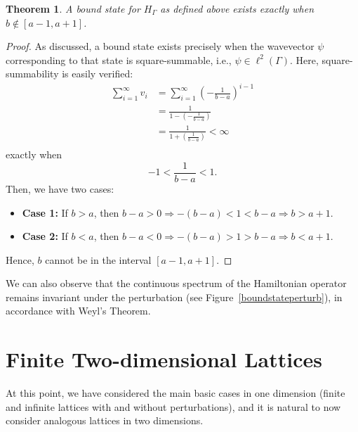 \documentclass{article}
\newtheorem{theorem}{Theorem}
\newcommand{\hg}{H_\Gamma}
\numberwithin{equation}{section}
\numberwithin{theorem}{section}
\numberwithin{proposition}{section}
\numberwithin{lemma}{section}
\numberwithin{corollary}{section}
\numberwithin{definition}{section}
\begin{document}
\begin{theorem}
	A bound state for $\hg$ as defined above exists exactly when $b \notin [a-1, a+1]$.
\end{theorem}

\begin{proof}
As discussed, a bound state exists precisely when the wavevector $\psi$ corresponding to that state is square-summable, i.e., $\psi \in \ell^2(\Gamma)$. Here, square-summability is easily verified:
\begin{align*}
	\sum\limits_{i=1}^\infty v_i &= \sum\limits_{i=1}^\infty \left( - \frac{1}{b-a} \right) ^ {i-1} \\
		&= \frac{1}{1-\left( - \frac{1}{b-a} \right)} \\
		&= \frac{1}{1 +\left( \frac{1}{b-a} \right)} < \infty \\
\end{align*}
exactly when \[-1 < \frac{1}{b-a} <1.\] Then, we have two cases:
\begin{itemize}
	\item \textbf{Case 1:} If $b > a$, then $b-a > 0 \Rightarrow -(b-a) < 1 < b-a \Rightarrow b > a+1.$
	\item \textbf{Case 2:} If $b < a$, then $b-a < 0 \Rightarrow -(b-a) > 1 > b-a \Rightarrow b < a+1.$
\end{itemize}
Hence, $b$ cannot be in the interval $[a-1, a+1]$.
\end{proof}
We can also observe that the continuous spectrum of the Hamiltonian operator remains invariant under the perturbation (see Figure~\ref{boundstateperturb}), in accordance with Weyl's Theorem.

\section{Finite Two-dimensional Lattices}
At this point, we have considered the main basic cases in one dimension (finite and infinite lattices with and without perturbations), and it is natural to now consider analogous lattices in two dimensions. 
\end{document}

